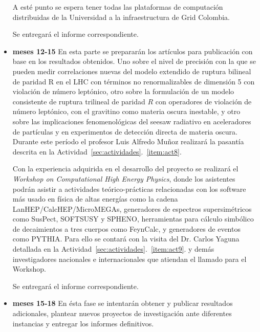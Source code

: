 \begin{itemize}
  A esté punto se espera tener todas las plataformas de computación
  distribuidas de la Universidad a la infraestructura de Grid
  Colombia. 

  Se entregará el informe correspondiente.

\item \textbf{meses 12-15} En esta parte se prepararán los artículos
  para publicación con base en los resultados obtenidos. Uno sobre el
  nivel de precisión con la que se pueden medir correlaciones nuevas
  del modelo extendido de ruptura bilineal de paridad R en el LHC con
  términos no renormalizables de dimensión 5 con violación de número
  leptónico, otro sobre la formulación de un modelo consistente de
  ruptura trilineal de paridad $R$ con operadores de violación de
  número leptónico, con el gravitino como materia oscura inestable, y
  otro sobre las implicaciones fenomenológicas del seesaw radiativo en
  aceleradores de partículas y en experimentos de detección directa de
  materia oscura. Durante este período el profesor Luis Alfredo Muñoz
  realizará la pasantía descrita en la
  Actividad~\ref{sec:actividades}.~\ref{item:act8}. 

  Con la experiencia adquirida en el desarrollo del proyecto se
  realizará el \emph{Workshop on Computational High Energy Physics},
  donde los asistentes podrán asistir a actividades teórico-prácticas
  relacionadas con los software más usado en física de altas energías
  como la cadena LanHEP/CalcHEP/MicroMEGAs, generadores de espectros
  supersimétricos como SusPect, SOFTSUSY y SPHENO, herramientas para
  cálculo simbólico de decaimientos a tres cuerpos como FeynCalc, y
  generadores de eventos como PYTHIA. Para ello se contará con la
  visita del Dr. Carlos Yaguna detallada en la
  Actividad~\ref{sec:actividades}.~\ref{item:act9}. y demás
  investigadores nacionales e internacionales que atiendan el llamado
  para el Workshop.

  Se entregará el informe correspondiente.
\item \textbf{meses 15-18}
  En ésta fase se intentarán obtener y publicar resultados
  adicionales, plantear nuevos proyectos de investigación ante
  diferentes instancias y entregar los informes definitivos.
\end{itemize}

